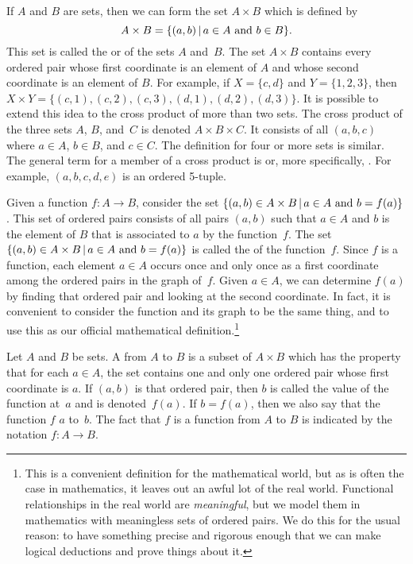 If $A$ and $B$ are sets, then we can form the set
$A\times B$ which is defined by \[A\times B=
\{(a,b)\,|\, a\in A \text{ and } b\in B\}.\]
This set is called the  or
 of the sets $A$ and~$B$.
The set $A\times B$ contains every ordered pair whose first
coordinate is an element of $A$ and whose second coordinate is
an element of $B$.  For example, if $X=\{c,d\}$ and
$Y=\{1,2,3\}$, then $X\times Y=\{(c,1), (c,2), (c,3), (d,1),(d,2), (d,3)\}$.
It is possible to extend this idea to the cross product
of more than two sets.  The cross product of the three sets
$A$, $B$, and~$C$ is denoted $A\times B\times C$.  It consists
of all  $(a,b,c)$
where $a\in A$, $b\in B$, and $c\in C$.  The definition for
four or more sets is similar.  The general term for a member
of a cross product is  or, more specifically,
.  For example, $(a,b,c,d,e)$ is
an ordered 5-tuple.

Given a function $f\colon A\to B$, consider the
set $\{(a,b)\in A\times B\,|\, a\in A \text{ and } b=f(a)\}$.  
This set of ordered pairs consists
of all pairs $(a,b)$ such that $a\in A$ and $b$ is the element of
$B$ that is associated to $a$ by the function~$f$.  The set
$\{(a,b)\in A\times B\,|\, a\in A \text{ and } b=f(a)\}$ is called the
 of the function~$f$.  Since $f$ is a function,
each element $a\in A$ occurs once and only once as a first coordinate
among the ordered pairs in the graph of~$f$.  Given $a\in A$, we
can determine $f(a)$ by finding that ordered pair and looking
at the second coordinate.  In fact, it is convenient to consider
the function and its graph to be the same thing, and to use
this as our official mathematical definition.\footnote{This is
a convenient definition for the mathematical world, but as is often
the case in mathematics, it leaves out an awful lot of the real
world.  Functional relationships in the real world are \emph{meaningful},
but we model them in mathematics with meaningless sets of ordered
pairs.  We do this for the usual reason: to have something precise
and rigorous enough that we can make logical deductions and prove
things about it.}

\begin{definition}
Let $A$ and $B$ be sets.  A  from $A$ to
$B$ is a subset of $A\times B$ which has the property that
for each $a\in A$, the set contains one and only one ordered
pair whose first coordinate is $a$.  If $(a,b)$ is that
ordered pair, then $b$ is called the value of the function at~$a$
and is denoted~$f(a)$.  If $b=f(a)$, then we also say that the
function $f$  $a$ to~$b$.
The fact that $f$ is a function from
$A$ to $B$ is indicated by the notation $f\colon A\to B$.
\end{definition}

